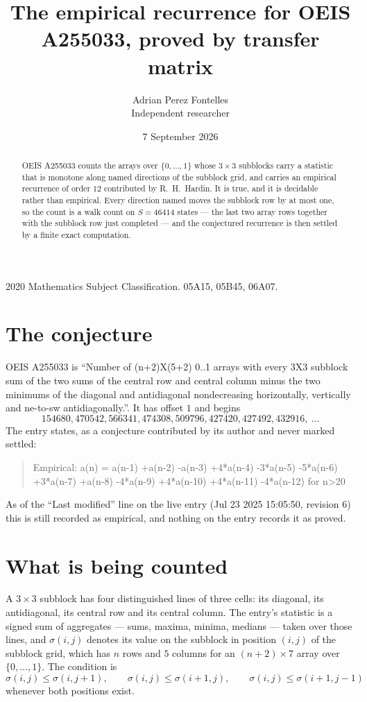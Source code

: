 \documentclass[11pt,a4paper]{article}
\title{The empirical recurrence for OEIS A255033, proved by transfer matrix}
\author{Adrian Perez Fontelles\\ \small Independent researcher}
\date{7 September 2026}
\theoremstyle{plain}
\theoremstyle{definition}
\begin{document}
\maketitle

\begin{abstract}
OEIS A255033 counts the arrays over $\{0,\dots,1\}$ whose $3\times3$ subblocks carry a
statistic that is monotone along named directions of the subblock grid, and carries an
empirical recurrence of order $12$ contributed by R.~H.~Hardin. It is true, and it is
decidable rather than empirical. Every direction named moves the subblock row by at most one,
so the count is a walk count on $S=46414$ states --- the last two array rows together with the
subblock row just completed --- and the conjectured recurrence is then settled by a finite
exact computation.
\end{abstract}

\noindent\small 2020 Mathematics Subject Classification. 05A15, 05B45, 06A07.\normalsize

\section{The conjecture}

OEIS A255033 is ``Number of (n+2)X(5+2) 0..1 arrays with every 3X3 subblock sum of the two sums of the central row and central column minus the two minimums of the diagonal and antidiagonal nondecreasing horizontally, vertically and ne-to-sw antidiagonally.''. It has offset $1$ and begins
\[
154680, 470542, 566341, 474308, 509796, 427420, 427492, 432916,\ \dots
\]
The entry states, as a conjecture contributed by its author and never marked settled:
\begin{quote}
Empirical: a(n) = a(n-1) +a(n-2) -a(n-3) +4*a(n-4) -3*a(n-5) -5*a(n-6) +3*a(n-7) +a(n-8) -4*a(n-9) +4*a(n-10) +4*a(n-11) -4*a(n-12) for n>20
\end{quote}
As of the ``Last modified'' line on the live entry (Jul 23 2025 15:05:50, revision 6) this is still
recorded as empirical, and nothing on the entry records it as proved.

\section{What is being counted}

A $3\times3$ subblock has four distinguished lines of three cells: its diagonal, its
antidiagonal, its central row and its central column. The entry's statistic is a signed sum of
aggregates --- sums, maxima, minima, medians --- taken over those lines, and $\sigma(i,j)$
denotes its value on the subblock in position $(i,j)$ of the subblock grid, which has $n$ rows
and $5$ columns for an $(n+2)\times7$ array over $\{0,\dots,1\}$. The condition is
\[
\sigma(i,j)\le\sigma(i,j+1),\qquad \sigma(i,j)\le\sigma(i+1,j),\qquad \sigma(i,j)\le\sigma(i+1,j-1)
\]
whenever both positions exist.
\end{document}
